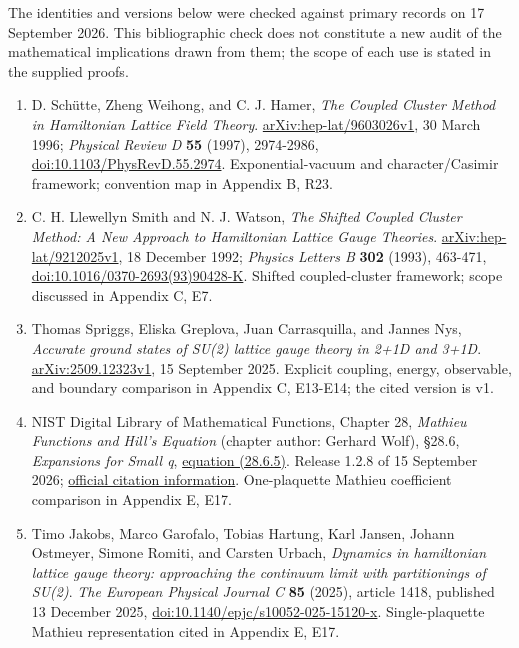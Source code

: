 \documentclass[11pt,a4paper]{article}
\providecommand{\tightlist}{\setlength{\itemsep}{0pt}\setlength{\parskip}{0pt}}
\renewcommand{\[}{\begingroup\small\originaldisplaystart}
\renewcommand{\]}{\originaldisplayend\endgroup}
\begin{document}
The identities and versions below were checked against primary records
on 17 September 2026. This bibliographic check does not constitute a new
audit of the mathematical implications drawn from them; the scope of
each use is stated in the supplied proofs.

\begin{enumerate}
\def\labelenumi{\arabic{enumi}.}
\tightlist
\item
  D. Schütte, Zheng Weihong, and C. J. Hamer, \emph{The Coupled Cluster
  Method in Hamiltonian Lattice Field Theory}.
  \href{https://arxiv.org/abs/hep-lat/9603026v1}{arXiv:hep-lat/9603026v1},
  30 March 1996; \emph{Physical Review D} \textbf{55} (1997), 2974-2986,
  \href{https://doi.org/10.1103/PhysRevD.55.2974}{doi:10.1103/PhysRevD.55.2974}.
  Exponential-vacuum and character/Casimir framework; convention map in
  Appendix B, R23.
\item
  C. H. Llewellyn Smith and N. J. Watson, \emph{The Shifted Coupled
  Cluster Method: A New Approach to Hamiltonian Lattice Gauge Theories}.
  \href{https://arxiv.org/abs/hep-lat/9212025v1}{arXiv:hep-lat/9212025v1},
  18 December 1992; \emph{Physics Letters B} \textbf{302} (1993),
  463-471,
  \href{https://doi.org/10.1016/0370-2693(93)90428-K}{doi:10.1016/0370-2693(93)90428-K}.
  Shifted coupled-cluster framework; scope discussed in Appendix C, E7.
\item
  Thomas Spriggs, Eliska Greplova, Juan Carrasquilla, and Jannes Nys,
  \emph{Accurate ground states of SU(2) lattice gauge theory in 2+1D and
  3+1D}. \href{https://arxiv.org/abs/2509.12323v1}{arXiv:2509.12323v1},
  15 September 2025. Explicit coupling, energy, observable, and boundary
  comparison in Appendix C, E13-E14; the cited version is v1.
\item
  NIST Digital Library of Mathematical Functions, Chapter 28,
  \emph{Mathieu Functions and Hill's Equation} (chapter author: Gerhard
  Wolf), §28.6, \emph{Expansions for Small q},
  \href{https://dlmf.nist.gov/28.6.E5}{equation (28.6.5)}. Release 1.2.8
  of 15 September 2026; \href{https://dlmf.nist.gov/help/cite}{official
  citation information}. One-plaquette Mathieu coefficient comparison in
  Appendix E, E17.
\item
  Timo Jakobs, Marco Garofalo, Tobias Hartung, Karl Jansen, Johann
  Ostmeyer, Simone Romiti, and Carsten Urbach, \emph{Dynamics in
  hamiltonian lattice gauge theory: approaching the continuum limit with
  partitionings of SU(2)}. \emph{The European Physical Journal C}
  \textbf{85} (2025), article 1418, published 13 December 2025,
  \href{https://link.springer.com/article/10.1140/epjc/s10052-025-15120-x}{doi:10.1140/epjc/s10052-025-15120-x}.
  Single-plaquette Mathieu representation cited in Appendix E, E17.
\end{enumerate}
\end{document}
